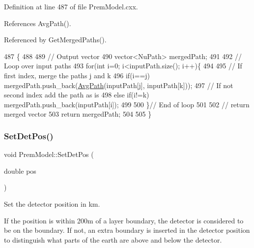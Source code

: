 Definition at line 487 of file Prem\+Model.\+cxx.



References Avg\+Path().



Referenced by Get\+Merged\+Paths().


\begin{DoxyCode}
487                                                                           \{
488 
489   \textcolor{comment}{// Output vector}
490   vector<NuPath> mergedPath;
491 
492   \textcolor{comment}{// Loop over input paths}
493   \textcolor{keywordflow}{for}(\textcolor{keywordtype}{int} i=0; i<inputPath.size(); i++)\{
494     
495     \textcolor{comment}{// If first index, merge the paths j and k}
496     \textcolor{keywordflow}{if}(i==j) mergedPath.push\_back(\hyperlink{classOscProb_1_1PremModel_a646977424cdca178a77694397146c2f8}{AvgPath}(inputPath[j], inputPath[k]));
497     \textcolor{comment}{// If not second index add the path as is}
498     \textcolor{keywordflow}{else} \textcolor{keywordflow}{if}(i!=k) mergedPath.push\_back(inputPath[i]);
499 
500   \}\textcolor{comment}{// End of loop}
501 
502   \textcolor{comment}{// return merged vector}
503   \textcolor{keywordflow}{return} mergedPath;
504 
505 \}
\end{DoxyCode}
\mbox{\label{classOscProb_1_1PremModel_a55b314e97ed9b92931e08ada0c0947eb}} 
\subsubsection{\texorpdfstring{Set\+Det\+Pos()}{SetDetPos()}}
{\footnotesize\ttfamily void Prem\+Model\+::\+Set\+Det\+Pos (\begin{DoxyParamCaption}\item[{double}]{pos }\end{DoxyParamCaption})\hspace{0.3cm}{\ttfamily [virtual]}}

Set the detector position in km.

If the position is within 200m of a layer boundary, the detector is considered to be on the boundary. If not, an extra boundary is inserted in the detector position to distinguish what parts of the earth are above and below the detector.

